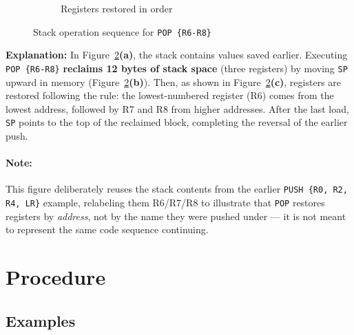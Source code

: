 \begin{figure}[H]
\begin{subfigure}[t]{0.3\textwidth}
    \caption{Registers restored in order}
    \label{fig:stack-pop-restore}
\end{subfigure}

\caption{Stack operation sequence for \texttt{POP \{R6-R8\}}}
\label{fig:stack-pop-sequence}
\end{figure}
\noindent\textbf{Explanation:}
In Figure~\ref{fig:stack-pop-sequence}\textbf{(a)}, the stack contains values saved earlier.
Executing \texttt{POP \{R6-R8\}} \textbf{reclaims 12 bytes of stack space} (three registers) by moving \texttt{SP} upward in memory (Figure~\ref{fig:stack-pop-sequence}\textbf{(b)}).
Then, as shown in Figure~\ref{fig:stack-pop-sequence}\textbf{(c)}, registers are restored following the rule: the lowest-numbered register (R6) comes from the lowest address, followed by R7 and R8 from higher addresses.
After the last load, \texttt{SP} points to the top of the reclaimed block, completing the reversal of the earlier push.

\paragraph{Note:} This figure deliberately reuses the stack contents from the earlier \texttt{PUSH \{R0, R2, R4, LR\}} example, relabeling them R6/R7/R8 to illustrate that \texttt{POP} restores registers by \emph{address}, not by the name they were pushed under — it is not meant to represent the same code sequence continuing.



\newpage
\section{Procedure}

\subsection{Examples}

